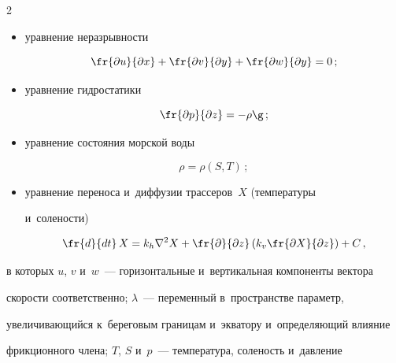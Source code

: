\begin{multicols}{2}
\begin{itemize}
  \begin{align*}


  -lv +\lambda u &=-\fr{1}{\rho}\,\fr{\partial p}{\partial x} 


+\fr{1}{\rho}\,\fr{\partial(k_w\tau_x)}{\partial z}\,;\\


  lu+\lambda v &= -\fr{1}{\rho}\,\fr{\partial p}{\partial y} +\fr{1}{\rho}\, 


\fr{\partial (k_w\tau_y)}{\partial z}\,;


  \end{align*}


  \item уравнение неразрывности


  $$


  \fr{\partial u}{\partial x} +\fr{\partial v}{\partial y} +\fr{\partial w}{\partial y} 


=0\,;


  $$


  \item уравнение гидростатики


  $$


  \fr{\partial p}{\partial z} =-\rho \g\,;


  $$


  \item уравнение состояния морской воды


  $$


  \rho= \rho(S,T)\,;


  $$


  \item уравнение переноса и~диффузии трассеров~$X$ (температуры 


и~солености)


  $$


  \fr{d}{dt}\,X= k_h\nabla^2 X+\fr{\partial}{\partial z}\left( k_v\fr{\partial 


X}{\partial z} \right) +C\,,


  $$


  \end{itemize}


в которых $u$, $v$ и~$w$~--- горизонтальные и~вертикальная компоненты вектора 


скорости соответственно; $\lambda$~--- переменный в~пространстве параметр, 


увеличивающийся к~береговым границам и~экватору и~определяющий влияние 


фрикционного члена; $T$, $S$ и~$p$~--- температура, соленость и~дав\-ле\-ние 



\end{multicols}
